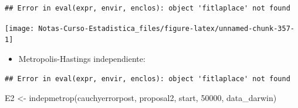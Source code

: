 \documentclass[
  12pt,
]{book}
\newenvironment{Shaded}{\begin{snugshade}}{\end{snugshade}}
\newcommand{\AttributeTok}[1]{\textcolor[rgb]{0.77,0.63,0.00}{#1}}
\newcommand{\DecValTok}[1]{\textcolor[rgb]{0.00,0.00,0.81}{#1}}
\newcommand{\FloatTok}[1]{\textcolor[rgb]{0.00,0.00,0.81}{#1}}
\newcommand{\FunctionTok}[1]{\textcolor[rgb]{0.00,0.00,0.00}{#1}}
\newcommand{\NormalTok}[1]{#1}
\newcommand{\OtherTok}[1]{\textcolor[rgb]{0.56,0.35,0.01}{#1}}
\newcommand{\SpecialCharTok}[1]{\textcolor[rgb]{0.00,0.00,0.00}{#1}}
\newcommand{\StringTok}[1]{\textcolor[rgb]{0.31,0.60,0.02}{#1}}
\providecommand{\tightlist}{%
  \setlength{\itemsep}{0pt}\setlength{\parskip}{0pt}}
\theoremstyle{definition}
\theoremstyle{definition}
\theoremstyle{definition}
\theoremstyle{definition}
\theoremstyle{remark}
\begin{document}
\begin{verbatim}
## Error in eval(expr, envir, enclos): object 'fitlaplace' not found
\end{verbatim}

\begin{Shaded}
\end{Shaded}

\begin{center}\texttt{[image: Notas-Curso-Estadistica\_files/figure-latex/unnamed-chunk-357-1]} \end{center}

\begin{itemize}
\tightlist
\item
  Metropolis-Hastings independiente:
\end{itemize}

\begin{Shaded}
\end{Shaded}

\begin{verbatim}
## Error in eval(expr, envir, enclos): object 'fitlaplace' not found
\end{verbatim}

\begin{Shaded}
\begin{Highlighting}[]
\NormalTok{E2 }\OtherTok{\textless{}{-}} \FunctionTok{indepmetrop}\NormalTok{(cauchyerrorpost, proposal2, start,}
    \DecValTok{50000}\NormalTok{, data\_darwin)}
\end{Highlighting}
\end{Shaded}
\end{document}
